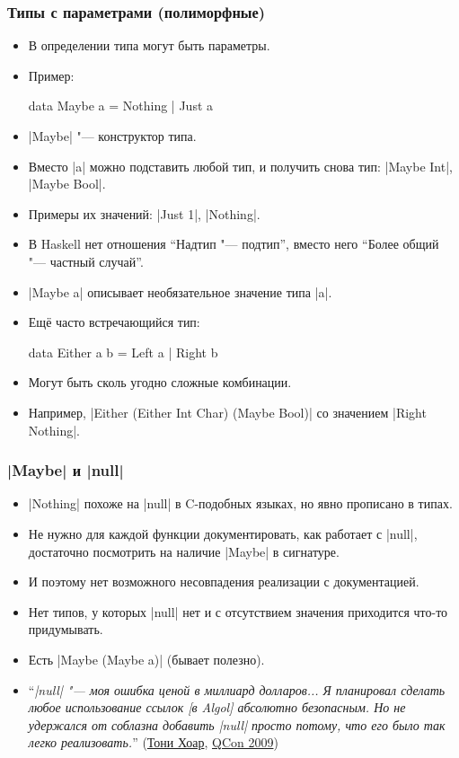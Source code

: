 \documentclass[10pt]{beamer}
\begin{document}
\begin{frame}[fragile]
  \frametitle{Типы с параметрами (полиморфные)}
  \begin{itemize}
    \item В определении типа могут быть параметры.
    \item Пример:
          \begin{haskell}
            data Maybe a = Nothing | Just a
          \end{haskell}
    \item \haskinline|Maybe| "--- конструктор типа.
    \item Вместо \haskinline|a| можно подставить любой тип, и получить снова тип: \haskinline|Maybe Int|, \haskinline|Maybe Bool|.
    \item Примеры их значений: \haskinline|Just 1|, \haskinline|Nothing|.
    \item В Haskell нет отношения \enquote{Надтип "--- подтип}, вместо него \enquote{Более общий "--- частный случай}.
    \item \haskinline|Maybe a| описывает необязательное значение типа \haskinline|a|.
          \pause
    \item Ещё часто встречающийся тип:
          \begin{haskell}
            data Either a b = Left a | Right b
          \end{haskell}
    \item Могут быть сколь угодно сложные комбинации.
    \item Например, \haskinline|Either (Either Int Char) (Maybe Bool)| со значением \haskinline|Right Nothing|.
  \end{itemize}
\end{frame}

\begin{frame}[fragile]
  \frametitle{\haskinline|Maybe| и \haskinline|null|}
  \begin{itemize}
    \item \haskinline|Nothing| похоже на \haskinline|null| в C-подобных языках, но явно прописано в типах.
    \item Не нужно для каждой функции документировать, как работает с \haskinline|null|, достаточно посмотрить на наличие \haskinline|Maybe| в сигнатуре.
    \item И поэтому нет возможного несовпадения реализации с документацией.
    \item Нет типов, у которых \haskinline|null| нет и с отсутствием значения приходится что-то придумывать.
    \item Есть \haskinline|Maybe (Maybe a)| (бывает полезно).
          \pause
    \item \enquote{\itshape \haskinline|null| "--- моя ошибка ценой в миллиард долларов... Я планировал сделать любое использование ссылок [в Algol] абсолютно безопасным. Но не удержался от соблазна добавить \haskinline|null| просто потому, что его было так легко реализовать.} (\href{https://ru.wikipedia.org/wiki/Хоар,_Чарльз_Энтони_Ричард}{Тони Хоар}, \href{https://www.infoq.com/presentations/Null-References-The-Billion-Dollar-Mistake-Tony-Hoare}{QCon 2009})
  \end{itemize}
\end{frame}
\end{document}
